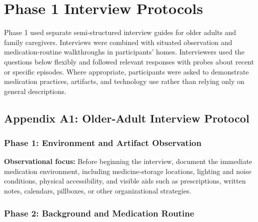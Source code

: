 \section{Phase 1 Interview Protocols}

Phase 1 used separate semi-structured interview guides for older adults and family caregivers. Interviews were combined with situated observation and medication-routine walkthroughs in participants' homes. Interviewers used the questions below flexibly and followed relevant responses with probes about recent or specific episodes. Where appropriate, participants were asked to demonstrate medication practices, artifacts, and technology use rather than relying only on general descriptions.

\subsection{Appendix A1: Older-Adult Interview Protocol}

\subsubsection{Phase 1: Environment and Artifact Observation}

\textbf{Observational focus:} Before beginning the interview, document the immediate medication environment, including medicine-storage locations, lighting and noise conditions, physical accessibility, and visible aids such as prescriptions, written notes, calendars, pillboxes, or other organizational strategies.

\subsubsection{Phase 2: Background and Medication Routine}

